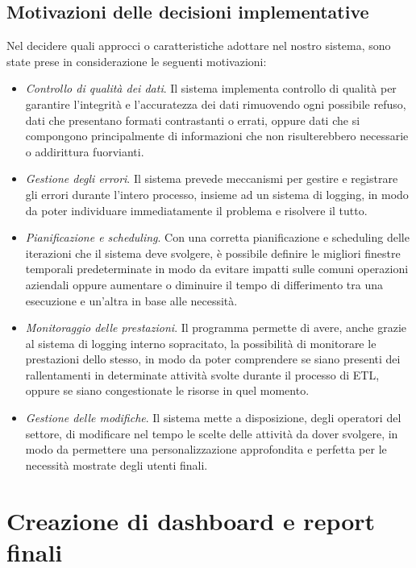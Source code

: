 \subsection{Motivazioni delle decisioni implementative}

Nel decidere quali approcci o caratteristiche adottare nel nostro sistema, sono state prese in considerazione le seguenti motivazioni:
\begin{itemize}
    \item \textit{Controllo di qualità dei dati}. Il sistema implementa controllo di qualità per garantire l'integrità e l'accuratezza dei dati rimuovendo ogni possibile refuso, dati che presentano formati contrastanti o errati, oppure dati che si compongono principalmente di informazioni che non risulterebbero necessarie o addirittura fuorvianti.
    \item \textit{Gestione degli errori}. Il sistema prevede meccanismi per gestire e registrare gli errori durante l'intero processo, insieme ad un sistema di logging, in modo da poter individuare immediatamente il problema e risolvere il tutto.
    \item \textit{Pianificazione e scheduling}. Con una corretta pianificazione e scheduling delle iterazioni che il sistema deve svolgere, è possibile definire le migliori finestre temporali predeterminate in modo da evitare impatti sulle comuni operazioni aziendali oppure aumentare o diminuire il tempo di differimento tra una esecuzione e un'altra in base alle necessità.
    \item \textit{Monitoraggio delle prestazioni}. Il programma permette di avere, anche grazie al sistema di logging interno sopracitato, la possibilità di monitorare le prestazioni dello stesso, in modo da poter comprendere se siano presenti dei rallentamenti in determinate attività svolte durante il processo di ETL, oppure se siano congestionate le risorse in quel momento.
    \item \textit{Gestione delle modifiche}. Il sistema mette a disposizione, degli operatori del settore, di modificare nel tempo le scelte delle attività da dover svolgere, in modo da permettere una personalizzazione approfondita e perfetta per le necessità mostrate degli utenti finali.
\end{itemize}

\section{Creazione di dashboard e report finali}

